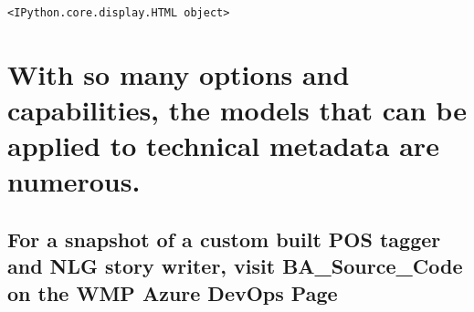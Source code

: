 \documentclass[11pt]{article}
\begin{document}
    
    \begin{verbatim}
<IPython.core.display.HTML object>
    \end{verbatim}

    
    \hypertarget{with-so-many-options-and-capabilities-the-models-that-can-be-applied-to-technical-metadata-are-numerous.}{%
\section{With so many options and capabilities, the models that can be
applied to technical metadata are
numerous.}\label{with-so-many-options-and-capabilities-the-models-that-can-be-applied-to-technical-metadata-are-numerous.}}

\hypertarget{for-a-snapshot-of-a-custom-built-pos-tagger-and-nlg-story-writer-visit-ba_source_code-on-the-wmp-azure-devops-page}{%
\subsection{For a snapshot of a custom built POS tagger and NLG story
writer, visit BA\_Source\_Code on the WMP Azure DevOps
Page}\label{for-a-snapshot-of-a-custom-built-pos-tagger-and-nlg-story-writer-visit-ba_source_code-on-the-wmp-azure-devops-page}}


    
    
    
    
\end{document}
